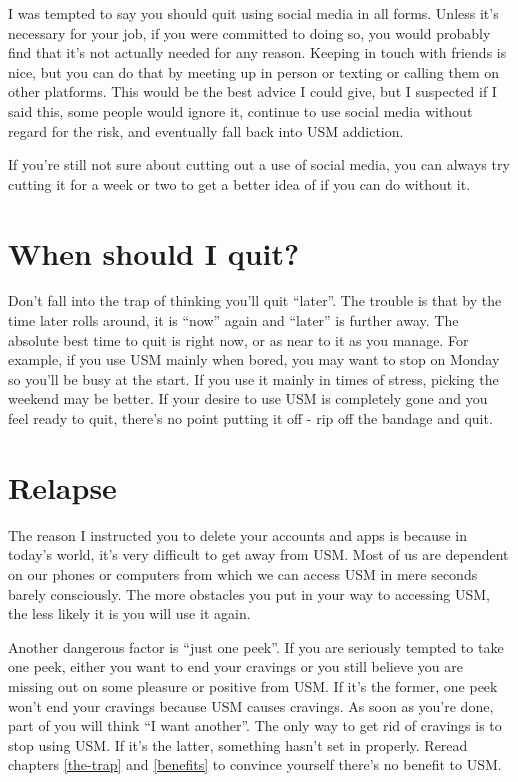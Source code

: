 \documentclass[
  openany]{book}
\begin{document}
I was tempted to say you should quit using social media in all forms. Unless it's necessary for your job, if you were committed to doing so, you would probably find that it's not actually needed for any reason. Keeping in touch with friends is nice, but you can do that by meeting up in person or texting or calling them on other platforms. This would be the best advice I could give, but I suspected if I said this, some people would ignore it, continue to use social media without regard for the risk, and eventually fall back into USM addiction.

If you're still not sure about cutting out a use of social media, you can always try cutting it for a week or two to get a better idea of if you can do without it.

\section{When should I quit?}\label{when-should-i-quit}

Don't fall into the trap of thinking you'll quit ``later''. The trouble is that by the time later rolls around, it is ``now'' again and ``later'' is further away. The absolute best time to quit is right now, or as near to it as you manage. For example, if you use USM mainly when bored, you may want to stop on Monday so you'll be busy at the start. If you use it mainly in times of stress, picking the weekend may be better. If your desire to use USM is completely gone and you feel ready to quit, there's no point putting it off - rip off the bandage and quit.

\section{Relapse}\label{relapse}

The reason I instructed you to delete your accounts and apps is because in today's world, it's very difficult to get away from USM. Most of us are dependent on our phones or computers from which we can access USM in mere seconds barely consciously. The more obstacles you put in your way to accessing USM, the less likely it is you will use it again.

Another dangerous factor is ``just one peek''. If you are seriously tempted to take one peek, either you want to end your cravings or you still believe you are missing out on some pleasure or positive from USM. If it's the former, one peek won't end your cravings because USM causes cravings. As soon as you're done, part of you will think ``I want another''. The only way to get rid of cravings is to stop using USM. If it's the latter, something hasn't set in properly. Reread chapters \ref{the-trap} and \ref{benefits} to convince yourself there's no benefit to USM.
\end{document}
